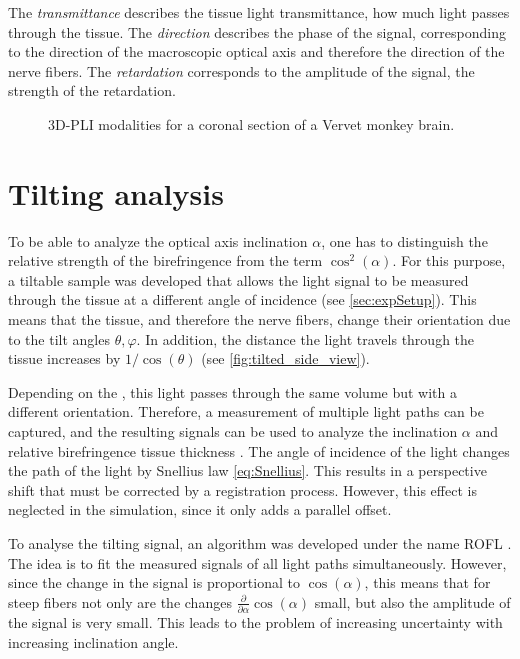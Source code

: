 %
The \textit{transmittance} describes the tissue light transmittance, \ie{} how much light passes through the tissue.
The \textit{direction} describes the phase of the signal, corresponding to the direction of the macroscopic optical axis and therefore the direction of the nerve fibers.
The \textit{retardation} corresponds to the amplitude of the signal, \ie{} the strength of the retardation.
%
\begin{figure}[t]

\caption[3D-PLI modalities]{3D-PLI modalities for a coronal section of a Vervet monkey brain.}
\end{figure}
%
%
\section{Tilting analysis} \label{sec::InclAnalysis}
%
To be able to analyze the optical axis inclination $\alpha$, one has to distinguish the relative strength of the birefringence from the term $\cos^2(\alpha)$.
For this purpose, a tiltable sample was developed that allows the light signal to be measured through the tissue at a different angle of incidence \cite{Axer2011, Wiese:887678} (see \cref{sec:expSetup}).
This means that the tissue, and therefore the nerve fibers, change their orientation due to the tilt angles $\theta, \varphi$.
In addition, the distance the light travels through the tissue increases by $1/\cos(\theta)$ (see \cref{fig:tilted_side_view}).
\par
%
Depending on the \Pixelsize{}, this light passes through the same volume but with a different orientation.
Therefore, a measurement of multiple light paths can be captured, and the resulting signals can be used to analyze the inclination $\alpha$ and relative birefringence tissue thickness \trel{}.
The angle of incidence of the light changes the path of the light by Snellius law \cref{eq:Snellius}.
This results in a perspective shift that must be corrected by a registration process.
However, this effect is neglected in the simulation, since it only adds a parallel offset.
\par
%
To analyse the tilting signal, an algorithm was developed under the name \ac{ROFL} \cite{Wiese:887678,Schmitz2018}.
The idea is to fit the measured signals of all light paths simultaneously.
However, since the change in the signal is proportional to $\cos(\alpha)$, this means that for steep fibers not only are the changes $\frac{\partial}{\partial \alpha} \cos(\alpha)$ small, but also the amplitude of the signal is very small.
This leads to the problem of increasing uncertainty with increasing inclination angle.
